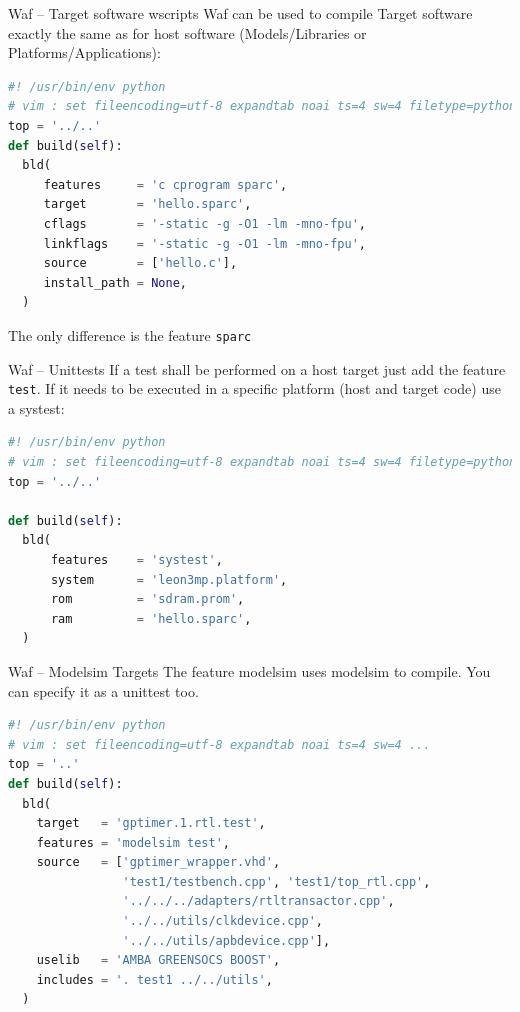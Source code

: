 \documentclass[fleqn,11pt,aspectratio=43]{beamer}
\begin{document}
\begin{frame}[fragile]{Waf – Target software wscripts}
Waf can be used to compile Target software exactly the same as for host software (Models/Libraries or Platforms/Applications):
  
\begin{lstlisting}[language=python]
#! /usr/bin/env python
# vim : set fileencoding=utf-8 expandtab noai ts=4 sw=4 filetype=python :
top = '../..'
def build(self):
  bld(
     features     = 'c cprogram sparc',
     target       = 'hello.sparc',
     cflags       = '-static -g -O1 -lm -mno-fpu',
     linkflags    = '-static -g -O1 -lm -mno-fpu',
     source       = ['hello.c'],
     install_path = None,
  )
\end{lstlisting}
The only difference is the feature {\tt sparc}
\end{frame}

\begin{frame}[fragile]{Waf – Unittests}
If a test shall be performed on a host target just add the feature {\tt test}.
If it needs to be executed in a specific platform (host and target code) use a systest:
\begin{lstlisting}[language=python]
#! /usr/bin/env python
# vim : set fileencoding=utf-8 expandtab noai ts=4 sw=4 filetype=python :
top = '../..'

def build(self):
  bld(
      features    = 'systest',
      system      = 'leon3mp.platform',
      rom         = 'sdram.prom',
      ram         = 'hello.sparc',
  )
\end{lstlisting}
\end{frame}

\begin{frame}[fragile]{Waf – Modelsim Targets}
The feature modelsim uses modelsim to compile. You can specify it as a unittest too.
\begin{lstlisting}[language=python]
#! /usr/bin/env python
# vim : set fileencoding=utf-8 expandtab noai ts=4 sw=4 ...
top = '..'
def build(self):
  bld(
    target   = 'gptimer.1.rtl.test',
    features = 'modelsim test',
    source   = ['gptimer_wrapper.vhd',
                'test1/testbench.cpp', 'test1/top_rtl.cpp',
                '../../../adapters/rtltransactor.cpp',
                '../../utils/clkdevice.cpp',
                '../../utils/apbdevice.cpp'],
    uselib   = 'AMBA GREENSOCS BOOST',
    includes = '. test1 ../../utils',
  )
\end{lstlisting}
\end{frame}
\end{document}
